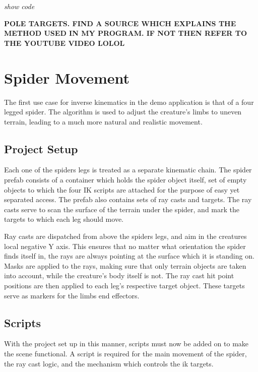 \textit{show code}

\textbf{POLE TARGETS. FIND A SOURCE WHICH EXPLAINS THE METHOD USED IN MY
PROGRAM. IF NOT THEN REFER TO THE YOUTUBE VIDEO LOLOL}


\section{Spider Movement}
The first use case for inverse kinematics in the demo application is that of
a four legged spider. The algorithm is used to adjust the creature's limbs to
uneven terrain, leading to a much more natural and realistic movement.
\subsection{Project Setup}
Each one of the spiders legs is treated as a separate kinematic chain. The
spider prefab consists of a container which holds the spider object itself, set
of empty objects to which the four IK scripts are attached for the purpose of
easy yet separated access. The prefab also contains sets of ray casts and
targets. The ray casts serve to scan the surface of the terrain under the
spider, and mark the targets to which each leg should move.

Ray casts are dispatched from above the spiders legs, and aim in the creatures
local negative Y axis. This ensures that no matter what orientation the spider
finds itself in, the rays are always pointing at the surface which it is
standing on. Masks are applied to the rays, making sure that only terrain
objects are taken into account, while the creature's body itself is not. The ray
cast hit point positions are then applied to each leg's respective target
object. These targets serve as markers for the limbs end effectors. 

\subsection{Scripts}
With the project set up in this manner, scripts must now be added on to make the
scene functional. A script is required for the main movement of the spider, the
ray cast logic, and the mechanism which controls the ik targets.

